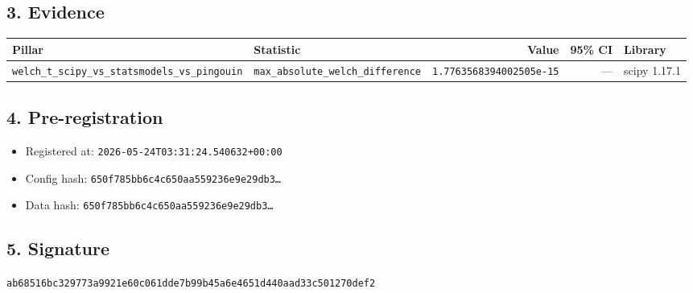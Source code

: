 \documentclass{article}
\begin{document}
\subsection*{3. Evidence}
\begin{tabular}{llrrl}\toprule
\textbf{Pillar} & \textbf{Statistic} & \textbf{Value} & \textbf{95\% CI} & \textbf{Library} \\\midrule
\texttt{welch\_t\_scipy\_vs\_statsmodels\_vs\_pingouin} & \texttt{max\_absolute\_welch\_difference} & \texttt{1.7763568394002505e-15} & --- & scipy 1.17.1 \\
\bottomrule\end{tabular}
\subsection*{4. Pre-registration}
\begin{itemize}
\item Registered at: \texttt{2026-05-24T03:31:24.540632+00:00}
\item Config hash: \texttt{650f785bb6c4c650aa559236e9e29db3\dots}
\item Data hash: \texttt{650f785bb6c4c650aa559236e9e29db3\dots}
\end{itemize}
\subsection*{5. Signature}
\texttt{ab68516bc329773a9921e60c061dde7b99b45a6e4651d440aad33c501270def2}\\
\end{document}
